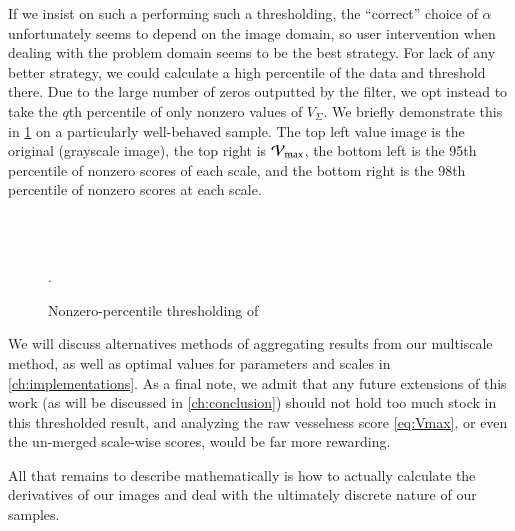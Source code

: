     If we insist on such a performing such a thresholding, the ``correct'' choice of $\alpha$ unfortunately seems to depend on the image domain, so user intervention when dealing with the problem domain seems to be the best strategy. For lack of any better strategy, we could calculate a high percentile of the data and threshold there. Due to the large number of zeros outputted by the filter, we opt instead to take the $q$th percentile of only nonzero values of $V_\Sigma$.
	We briefly demonstrate this in \cref{fig:qthresh_demo} on a particularly well-behaved sample. The top left value image is the original (grayscale image), the top right is $\mathcal{V}_{\max}$, the bottom left is the 95th percentile of nonzero scores of each scale, and the bottom right is the 98th percentile of nonzero scores at each scale.
	
	\begin{figure} \centering
		 \;
		 \\
		 \;
		 \\
		\caption{Nonzero-percentile thresholding of \Vmax}.
		\label{fig:qthresh_demo}
	\end{figure}

	We will discuss alternatives methods of aggregating results from our multiscale method, as well as optimal values for parameters and scales
	in \cref{ch:implementations}. As a final note, we admit that any future extensions of this work (as will be discussed in \cref{ch:conclusion}) should not hold too much stock in this thresholded result, and analyzing the 
	raw vesselness score \cref{eq:Vmax}, or even
	the un-merged scale-wise scores, would be far more
	rewarding.    
	

All that remains to describe mathematically is how to actually calculate the derivatives of our images and deal with the ultimately discrete nature of our samples.    